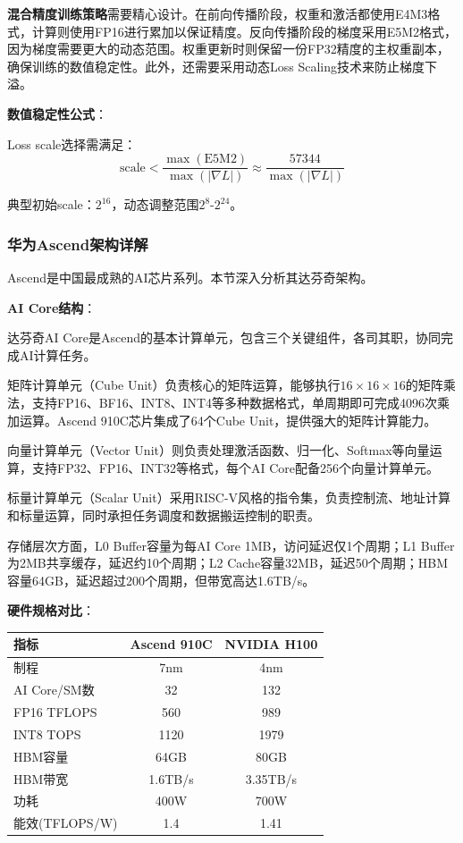 \textbf{混合精度训练策略}需要精心设计。在前向传播阶段，权重和激活都使用E4M3格式，计算则使用FP16进行累加以保证精度。反向传播阶段的梯度采用E5M2格式，因为梯度需要更大的动态范围。权重更新时则保留一份FP32精度的主权重副本，确保训练的数值稳定性。此外，还需要采用动态Loss Scaling技术来防止梯度下溢。

\textbf{数值稳定性公式}：

Loss scale选择需满足：
\begin{equation}
\text{scale} < \frac{\max(\text{E5M2})}{\max(|\nabla L|)} \approx \frac{57344}{\max(|\nabla L|)}
\end{equation}

典型初始scale：$2^{16}$，动态调整范围$2^{8}$-$2^{24}$。

\subsubsection{华为Ascend架构详解}

Ascend是中国最成熟的AI芯片系列。本节深入分析其达芬奇架构\cite{Huawei2024Ascend, HotChips2024Ascend}。

\textbf{AI Core结构}：

达芬奇AI Core是Ascend的基本计算单元，包含三个关键组件，各司其职，协同完成AI计算任务。

矩阵计算单元（Cube Unit）负责核心的矩阵运算，能够执行$16 \times 16 \times 16$的矩阵乘法，支持FP16、BF16、INT8、INT4等多种数据格式，单周期即可完成4096次乘加运算。Ascend 910C芯片集成了64个Cube Unit，提供强大的矩阵计算能力。

向量计算单元（Vector Unit）则负责处理激活函数、归一化、Softmax等向量运算，支持FP32、FP16、INT32等格式，每个AI Core配备256个向量计算单元。

标量计算单元（Scalar Unit）采用RISC-V风格的指令集，负责控制流、地址计算和标量运算，同时承担任务调度和数据搬运控制的职责。

存储层次方面，L0 Buffer容量为每AI Core 1MB，访问延迟仅1个周期；L1 Buffer为2MB共享缓存，延迟约10个周期；L2 Cache容量32MB，延迟50个周期；HBM容量64GB，延迟超过200个周期，但带宽高达1.6TB/s。

\textbf{硬件规格对比}：

\begin{table}[H]
\centering
\small
\begin{tabular}{lcc}
\toprule
\textbf{指标} & \textbf{Ascend 910C} & \textbf{NVIDIA H100} \\
\midrule
制程 & 7nm & 4nm \\
AI Core/SM数 & 32 & 132 \\
FP16 TFLOPS & 560 & 989 \\
INT8 TOPS & 1120 & 1979 \\
HBM容量 & 64GB & 80GB \\
HBM带宽 & 1.6TB/s & 3.35TB/s \\
功耗 & 400W & 700W \\
能效(TFLOPS/W) & 1.4 & 1.41 \\
\bottomrule
\end{tabular}
\end{table}

